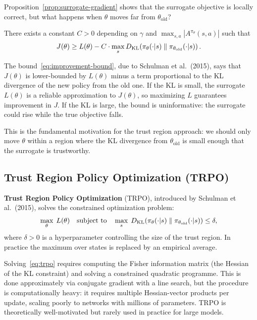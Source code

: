 Proposition~\ref{prop:surrogate-gradient} shows that the surrogate objective
is locally correct, but what happens when $\theta$ moves far from
$\theta_\mathrm{old}$?

\begin{proposition}
\label{prop:monotone-improvement}
There exists a constant $C > 0$ depending on $\gamma$ and
$\max_{s,a}|A^{\pi_\theta}(s,a)|$ such that
\begin{equation}
\label{eq:improvement-bound}
J(\theta) \geq L(\theta)
- C \cdot \max_s D_{\mathrm{KL}}\!\left(\pi_\theta(\cdot|s)\;\|\;\pi_{\theta_\mathrm{old}}(\cdot|s)\right).
\end{equation}
\end{proposition}

The bound~\eqref{eq:improvement-bound}, due to Schulman et al.~(2015),
says that $J(\theta)$ is lower-bounded by $L(\theta)$ minus a term
proportional to the KL divergence of the new policy from the old one.
If the KL is small, the surrogate $L(\theta)$ is a reliable approximation
to $J(\theta)$, so maximizing $L$ guarantees improvement in $J$.  If the
KL is large, the bound is uninformative: the surrogate could rise while the
true objective falls.

This is the fundamental motivation for the trust region
approach: we should only move $\theta$ within a region where the KL
divergence from $\theta_\mathrm{old}$ is small enough that
the surrogate is trustworthy.

\subsection{Trust Region Policy Optimization (TRPO)}

\textbf{Trust Region Policy Optimization} (TRPO),
introduced by Schulman et al.~(2015), solves the constrained optimization
problem:
\begin{equation}
\label{eq:trpo}
\max_\theta\; L(\theta)
\quad\text{subject to}\quad
\max_s\;D_{\mathrm{KL}}\!\left(\pi_\theta(\cdot|s)\;\|\;\pi_{\theta_\mathrm{old}}(\cdot|s)\right) \leq \delta,
\end{equation}
where $\delta > 0$ is a hyperparameter controlling the size of the trust
region.  In practice the maximum over states is replaced by an empirical
average.

Solving~\eqref{eq:trpo} requires computing the Fisher information matrix
(the Hessian of the KL constraint) and solving a constrained quadratic
programme.  This is done approximately via conjugate gradient with a line
search, but the procedure is computationally heavy: it requires multiple
Hessian-vector products per update, scaling poorly to networks with millions
of parameters.  TRPO is theoretically well-motivated but rarely used in
practice for large models.

